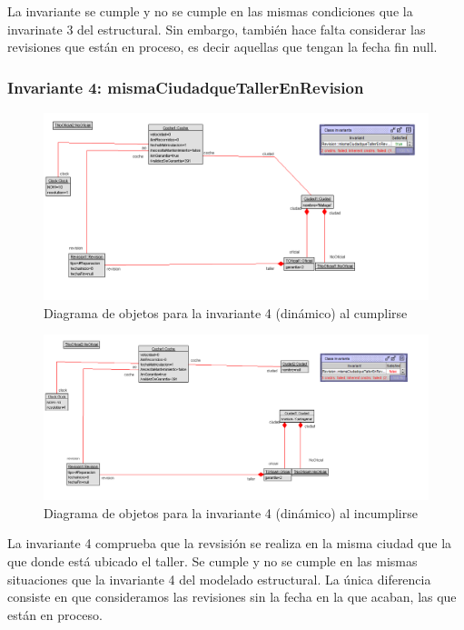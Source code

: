 \documentclass[12pt.a4paper]{article}
\begin{document}
La invariante se cumple y no se cumple en las mismas condiciones que la invarinate 3 del estructural. Sin embargo, también hace falta considerar las revisiones que están en proceso, es decir aquellas que tengan la fecha fin null.

\subsubsection{Invariante 4: mismaCiudadqueTallerEnRevision}
\vspace{1.0 cm}
\begin{figure}[H]
     \includegraphics[width=1\linewidth]{Soils/dinamico_inv4_bien.png}
     \caption{Diagrama de objetos para la invariante 4 (dinámico) al cumplirse}
\end{figure}
\begin{figure}[H]
     \includegraphics[width=1\linewidth]{Soils/dinamico_inv4_false.png}
     \caption{Diagrama de objetos para la invariante 4 (dinámico) al incumplirse}
\end{figure}

La invariante 4 comprueba que la revsisión se realiza en la misma ciudad que la que donde está ubicado el taller. Se cumple y no se cumple en las mismas situaciones que la invariante 4 del modelado estructural. La única diferencia consiste en que consideramos las revisiones sin la fecha en la que acaban, las que están en proceso.
\end{document}
